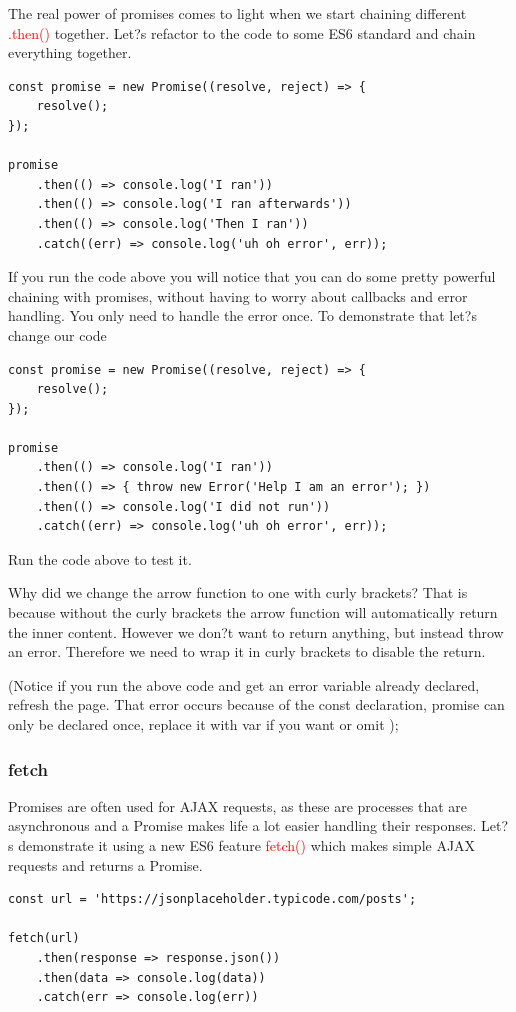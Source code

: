 \documentclass[a4paper]{article}
\begin{document}
The real power of promises comes to light when we start chaining different \textcolor{red}{.then()} together. Let?s refactor to the code to some ES6 standard and chain everything together.
\begin{lstlisting}
const promise = new Promise((resolve, reject) => {
    resolve();
});

promise
    .then(() => console.log('I ran'))
    .then(() => console.log('I ran afterwards'))
    .then(() => console.log('Then I ran'))
    .catch((err) => console.log('uh oh error', err));
\end{lstlisting}
If you run the code above you will notice that you can do some pretty powerful chaining with promises, without having to worry about callbacks and error handling. You only need to handle the error once. To demonstrate that let?s change our code
\begin{lstlisting}
const promise = new Promise((resolve, reject) => {
    resolve();
});

promise
    .then(() => console.log('I ran'))
    .then(() => { throw new Error('Help I am an error'); })
    .then(() => console.log('I did not run'))
    .catch((err) => console.log('uh oh error', err));
\end{lstlisting}
Run the code above to test it.

Why did we change the arrow function to one with curly brackets? That is because without the curly brackets the arrow function will automatically return the inner content. However we don?t want to return anything, but instead throw an error. Therefore we need to wrap it in curly brackets to disable the return.

(Notice if you run the above code and get an error variable already declared, refresh the page. That error occurs because of the const declaration, promise can only be declared once, replace it with var if you want or omit );
\subsubsection{fetch}
Promises are often used for AJAX requests, as these are processes that are asynchronous and a Promise makes life a lot easier handling their responses. Let?s demonstrate it using a new ES6 feature \textcolor{red}{fetch()} which makes simple AJAX requests and returns a Promise.
\begin{lstlisting}
const url = 'https://jsonplaceholder.typicode.com/posts';

fetch(url)
    .then(response => response.json())
    .then(data => console.log(data))
    .catch(err => console.log(err))
\end{lstlisting}
\end{document}
